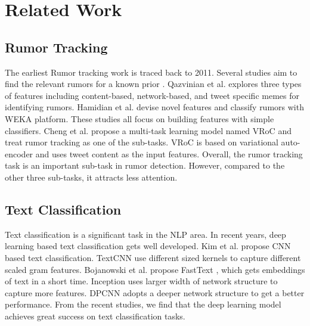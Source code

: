 \section{Related Work}
\label{sec:related}

\subsection{Rumor Tracking}
\label{sec:rumortracking}
The earliest Rumor tracking work is traced back to 2011. Several studies aim to find the relevant rumors for a known prior \cite{DBLP:journals/csur/ZubiagaABLP18}. Qazvinian et al. \cite{DBLP:conf/emnlp/QazvinianRRM11} explores three types of features including content-based, network-based, and tweet specific memes for identifying rumors. Hamidian et al. \cite{DBLP:journals/corr/abs-1912-08926} devise novel features and classify rumors with WEKA platform. These studies all focus on building features with simple classifiers. Cheng et al. \cite{DBLP:conf/www/ChengNB20} propose a multi-task learning model named VRoC and treat rumor tracking as one of the sub-tasks. VRoC is based on variational auto-encoder and uses tweet content as the input features. Overall, the rumor tracking task is an important sub-task in rumor detection. However, compared to the other three sub-tasks, it attracts less attention.

\subsection{Text Classification}
\label{sec:textclassification}
Text classification is a significant task in the NLP area. In recent years, deep learning based text classification gets well developed. Kim et al. \cite{DBLP:conf/emnlp/Kim14} propose CNN based text classification. TextCNN use different sized kernels to capture different scaled gram features. Bojanowski et al. propose FastText  \cite{DBLP:journals/tacl/BojanowskiGJM17}, which gets embeddings of text in a short time. Inception \cite{DBLP:journals/corr/SzegedyLJSRAEVR14} uses larger width of network structure to capture more features. DPCNN \cite{DBLP:conf/acl/JohnsonZ17} adopts a deeper network structure to get a better performance. From the recent studies, we find that the deep learning model achieves great success on text classification tasks.
